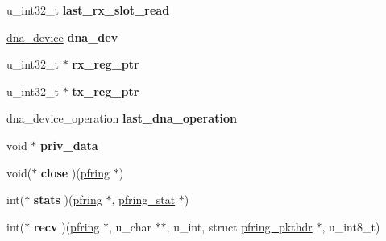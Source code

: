 \begin{DoxyCompactItemize}
\item 
\hypertarget{struct____pfring_ae818a3c3cacbbf525ce66ed1cf39cfde}{
u\_\-int32\_\-t {\bfseries last\_\-rx\_\-slot\_\-read}}
\label{struct____pfring_ae818a3c3cacbbf525ce66ed1cf39cfde}

\item 
\hypertarget{struct____pfring_a21c070166f93fb1e66c1031b0eba0122}{
\hyperlink{structdna__device}{dna\_\-device} {\bfseries dna\_\-dev}}
\label{struct____pfring_a21c070166f93fb1e66c1031b0eba0122}

\item 
\hypertarget{struct____pfring_a79bd6f91b615c712a6d503eaa259781d}{
u\_\-int32\_\-t $\ast$ {\bfseries rx\_\-reg\_\-ptr}}
\label{struct____pfring_a79bd6f91b615c712a6d503eaa259781d}

\item 
\hypertarget{struct____pfring_a8b671e91314cbe152c5125bae76fe3b2}{
u\_\-int32\_\-t $\ast$ {\bfseries tx\_\-reg\_\-ptr}}
\label{struct____pfring_a8b671e91314cbe152c5125bae76fe3b2}

\item 
\hypertarget{struct____pfring_a029f06f914dee680498b5f07ecdd6e93}{
dna\_\-device\_\-operation {\bfseries last\_\-dna\_\-operation}}
\label{struct____pfring_a029f06f914dee680498b5f07ecdd6e93}

\item 
\hypertarget{struct____pfring_a986da8d9b291f0c1b9060d08e8c051e3}{
void $\ast$ {\bfseries priv\_\-data}}
\label{struct____pfring_a986da8d9b291f0c1b9060d08e8c051e3}

\item 
\hypertarget{struct____pfring_a842eb60260197fad70b092e0b1fbc15b}{
void($\ast$ {\bfseries close} )(\hyperlink{struct____pfring}{pfring} $\ast$)}
\label{struct____pfring_a842eb60260197fad70b092e0b1fbc15b}

\item 
\hypertarget{struct____pfring_afbe369eb60b267ec56ccfe455dbe31bb}{
int($\ast$ {\bfseries stats} )(\hyperlink{struct____pfring}{pfring} $\ast$, \hyperlink{structpfring__stat}{pfring\_\-stat} $\ast$)}
\label{struct____pfring_afbe369eb60b267ec56ccfe455dbe31bb}

\item 
\hypertarget{struct____pfring_ab71d07142169758f6861eb85db470905}{
int($\ast$ {\bfseries recv} )(\hyperlink{struct____pfring}{pfring} $\ast$, u\_\-char $\ast$$\ast$, u\_\-int, struct \hyperlink{structpfring__pkthdr}{pfring\_\-pkthdr} $\ast$, u\_\-int8\_\-t)}
\label{struct____pfring_ab71d07142169758f6861eb85db470905}


\end{DoxyCompactItemize}
